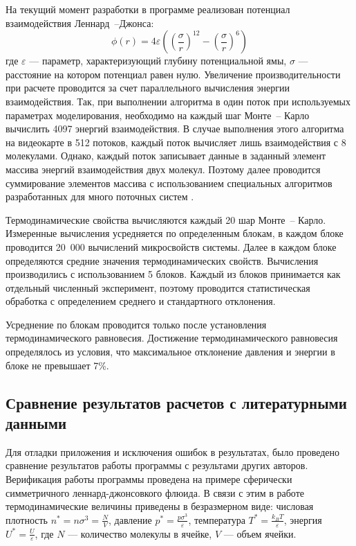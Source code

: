 На текущий момент разработки в программе реализован потенциал взаимодействия Леннард~--Джонса:
\begin{equation}
	\phi(r) = 4 \varepsilon \left( \left( \dfrac{\sigma}{r} \right) ^{12} - \left( \dfrac{\sigma}{r} \right) ^6 \right)
\end{equation}
где $\varepsilon$ --- параметр, характеризующий глубину потенциальной ямы, $\sigma$ --- расстояние на котором потенциал равен нулю.  Увеличение производительности при расчете проводится за счет параллельного вычисления энергии взаимодействия. Так, при выполнении алгоритма в один поток при используемых параметрах моделирования, необходимо на каждый шаг Монте~-- Карло вычислить 4097 энергий взаимодействия. В случае выполнения этого алгоритма на видеокарте в 512 потоков, каждый поток вычисляет лишь взаимодействия с 8 молекулами. Однако, каждый поток записывает данные в заданный элемент массива энергий взаимодействия двух молекул. Поэтому далее проводится суммирование элементов массива с использованием специальных алгоритмов разработанных для много поточных систем \cite{cuda_book}.

Термодинамические свойства вычисляются каждый 20 шар Монте~-- Карло. Измеренные вычисления усредняется по определенным блокам, в каждом блоке проводится 20~000 вычислений микросвойств системы. Далее в каждом блоке определяются средние значения термодинамических свойств. Вычисления производились с использованием 5 блоков. Каждый из блоков принимается как отдельный численный эксперимент, поэтому проводится статистическая обработка с определением среднего и стандартного отклонения.

Усреднение по блокам проводится только после установления термодинамического равновесия. Достижение термодинамического равновесия определялось из условия, что максимальное отклонение давления и энергии в блоке не превышает 7\%. 

\subsection{Сравнение результатов расчетов с литературными данными}
Для отладки приложения и исключения ошибок в результатах, было проведено сравнение результатов работы программы с результами других авторов. Верификация работы программы проведена на примере сферически симметричного леннард-джонсовкого флюида. 
В связи с этим в работе термодинамические величины приведены в безразмерном виде: числовая плотность $n^* = n \sigma ^3 = \frac{N}{V}$, давление $p^* = \frac{p \sigma^3}{\varepsilon}$, температура $T^* = \frac{k_B T}{\varepsilon}$, энергия $U^* = \frac{U}{\varepsilon}$, где $N$ --- количество молекулы в ячейке, $V$ --- объем ячейки.

